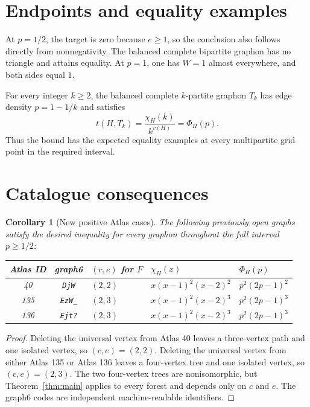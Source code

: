 \documentclass[11pt]{article}
\newtheorem{corollary}[theorem]{Corollary}
\begin{document}
\section{Endpoints and equality examples}

At $p=1/2$, the target is zero because $e\geq1$, so the conclusion
also follows directly from nonnegativity.  The balanced complete
bipartite graphon has no triangle and attains equality.  At $p=1$, one
has $W=1$ almost everywhere, and both sides equal $1$.

For every integer $k\geq2$, the balanced complete $k$-partite graphon
$T_k$ has edge density $p=1-1/k$ and satisfies
\[
t(H,T_k)=\frac{\chi_H(k)}{k^{v(H)}}=\Phi_H(p).
\]
Thus the bound has the expected equality examples at every multipartite
grid point in the required interval.


\section{Catalogue consequences}

\begin{corollary}[New positive Atlas cases]
The following previously open graphs satisfy the desired inequality for
every graphon throughout the full interval $p\geq1/2$:

\begin{center}
\begin{tabular}{cclll}
\hline
Atlas ID & graph6 & $(c,e)$ for $F$ & $\chi_H(x)$ & $\Phi_H(p)$ \\
\hline
40  & \texttt{DjW}  & $(2,2)$ & $x(x-1)^2(x-2)^2$ & $p^2(2p-1)^2$ \\
135 & \texttt{EzW\_} & $(2,3)$ & $x(x-1)^2(x-2)^3$ & $p^2(2p-1)^3$ \\
136 & \texttt{Ejt?} & $(2,3)$ & $x(x-1)^2(x-2)^3$ & $p^2(2p-1)^3$ \\
\hline
\end{tabular}
\end{center}
\end{corollary}

\begin{proof}
Deleting the universal vertex from Atlas 40 leaves a three-vertex path
and one isolated vertex, so $(c,e)=(2,2)$.  Deleting the universal
vertex from either Atlas 135 or Atlas 136 leaves a four-vertex tree and
one isolated vertex, so $(c,e)=(2,3)$.  The two four-vertex trees are
nonisomorphic, but Theorem~\ref{thm:main} applies to every forest and
depends only on $c$ and $e$.  The graph6 codes are independent
machine-readable identifiers.
\end{proof}
\end{document}
